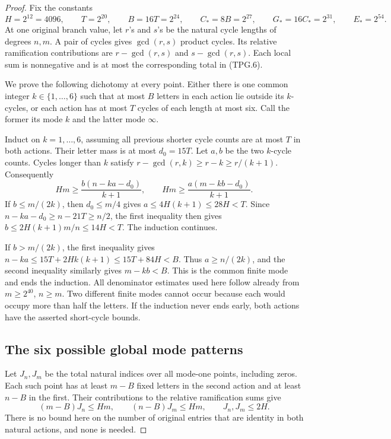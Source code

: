 \begin{proof}
Fix the constants
\[
 H=2^{12}=4096,\qquad T=2^{20},\qquad B=16T=2^{24},
 \qquad C_*=8B=2^{27},\qquad G_*=16C_*=2^{31},
 \qquad E_*=2^{54}.
 \tag{TPG.7}
\]
At one original branch value, let \(r\)'s and \(s\)'s be
the natural cycle lengths of degrees \(n,m\).  A pair of
cycles gives \(\gcd(r,s)\) product cycles.  Its relative
ramification contributions are \(r-\gcd(r,s)\) and
\(s-\gcd(r,s)\).  Each local sum is nonnegative and is at
most the corresponding total in (TPG.6).

We prove the following dichotomy at every point.  Either there
is one common integer \(k\in\{1,\ldots,6\}\) such that at
most \(B\) letters in each action lie outside its \(k\)-cycles,
or each action has at most \(T\) cycles of each length at most
six.  Call the former its mode \(k\) and the latter mode
\(\infty\).

Induct on \(k=1,\ldots,6\), assuming all previous shorter
cycle counts are at most \(T\) in both actions.  Their letter
mass is at most \(d_0=15T\).  Let \(a,b\) be the two
\(k\)-cycle counts.  Cycles longer than \(k\) satisfy
\(r-\gcd(r,k)\ge r-k\ge r/(k+1)\).  Consequently
\[
 Hm\ge\frac{b(n-ka-d_0)}{k+1},\qquad
 Hm\ge\frac{a(m-kb-d_0)}{k+1}.
 \tag{TPG.8}
\]
If \(b\le m/(2k)\), then \(d_0\le m/4\) gives
\(a\le4H(k+1)\le28H<T\).  Since
\(n-ka-d_0\ge n-21T\ge n/2\), the first inequality
then gives \(b\le2H(k+1)m/n\le14H<T\).
The induction continues.

If \(b>m/(2k)\), the first inequality gives
\(n-ka\le15T+2Hk(k+1)\le15T+84H<B\).
Thus \(a\ge n/(2k)\), and the second inequality similarly
gives \(m-kb<B\).  This is the common finite mode and ends
the induction.  All denominator estimates used here follow
already from \(m\ge2^{40}\), \(n\ge m\).
Two different finite modes cannot occur because each would
occupy more than half the letters.  If the induction never
ends early, both actions have the asserted short-cycle bounds.

\subsection*{The six possible global mode patterns}

Let \(J_n,J_m\) be the total natural indices over all mode-one
points, including zeros.  Each such point has at least \(m-B\)
fixed letters in the second action and at least \(n-B\) in
the first.  Their contributions to the relative ramification
sums give
\[
       (m-B)J_n\le Hm,\qquad (n-B)J_m\le Hm,
       \qquad J_n,J_m\le2H.
 \tag{TPG.9}
\]
There is no bound here on the number of original entries that
are identity in both natural actions, and none is needed.


\end{proof}
